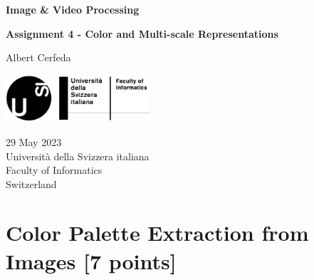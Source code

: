 \documentclass[tikz,14pt,fleqn]{article}
\newcommand\namesurname{Albert Cerfeda}
\newcommand\assignment{Assignment 4 - Color and Multi-scale Representations}
\newcommand\subject{Image \& Video Processing}
\newcommand\documentdate{29 May 2023}
\begin{document}
\begin{titlepage}
   \begin{center}
       \vspace*{0.2cm}

       \textbf{\Large{\subject}}

       \vspace{0.5cm}
        \textbf{\assignment}\\[5mm]
        
            
       \vspace{0.4cm}

        \namesurname
        \begin{figure}[H]
            \centering
        \end{figure}
       \tableofcontents

       \vspace*{\fill}
     
        \includegraphics[width=0.4\textwidth]{fig/logo.png}
       
        \documentdate \\
        Università della Svizzera italiana\\
        Faculty of Informatics\\
        Switzerland\\

   \end{center}
\end{titlepage}

\section{Color Palette Extraction from Images [7 points]}
\end{document}

